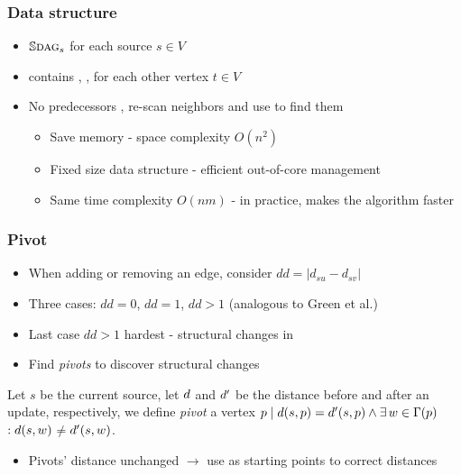 \begin{frame}
  \frametitle{Data structure}

  \begin{itemize}
    \item $\mathbb{S}\textsc{dag}_s$ for each source $s \in V$
    \item \spdag contains \dist, \paths, \dep for each other vertex $t \in V$
    \item No predecessors \pred, re-scan neighbors and use \dist to find them
    \begin{itemize}
      \item Save memory - space complexity $O(n^2)$
      \item Fixed size data structure - efficient out-of-core management
      \item Same time complexity $O(nm)$ - in practice, makes the algorithm faster
    \end{itemize}
  \end{itemize}

\end{frame}


\begin{frame}
  \frametitle{Pivot}

  \begin{itemize}
    \item When adding or removing an edge, consider $dd = |d_{su} - d_{sv}|$
    \item Three cases: $dd=0$, $dd=1$, $dd>1$ (analogous to Green et al.)
    \item Last case $dd>1$ hardest - structural changes in \spdag
    \item Find \emph{pivots} to discover structural changes
  \end{itemize}

  \begin{definition}[Pivot]
Let $s$ be the current source, let $d$ and $d'$ be the distance before and after an update, respectively, we define \emph{pivot} a vertex $p \mid d(s,p) = d'(s,p) \wedge \exists \, w \in \Gamma(p)$$: d(s,w)$$\neq$$d'(s,w)$.
  \end{definition}

  \begin{itemize}
    \item Pivots' distance unchanged $\rightarrow$ use as starting points to correct distances
  \end{itemize}

\end{frame}


